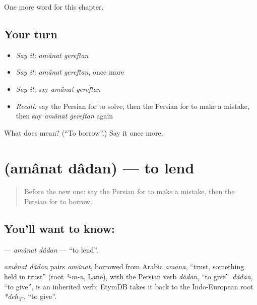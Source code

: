 \begin{grammarlens}[title={What you've built}]
One more word for this chapter.
\end{grammarlens}

\subsection*{Your turn}
\begin{itemize}
\raggedright
  \item \emph{Say it:} \emph{amânat gereftan}
  \item \emph{Say it:} \emph{amânat gereftan}, once more
  \item \emph{Say it:} say \emph{amânat gereftan}
  \item \emph{Recall:} say the Persian for to solve, then the Persian for to make a mistake, then say \emph{amânat gereftan} again
\end{itemize}

\begin{tcolorbox}[breakable,colback=teal!4,colframe=teal!35!black,title={Before you move on}]
What does   mean? (\textquotedblleft{}To borrow\textquotedblright{}.) Say it once more.
\end{tcolorbox}
\section[\texorpdfstring{\fa{امانت} \fa{دادن} (amânat dâdan)}{امانت دادن (amânat dâdan)}]{  (amânat dâdan) — to lend}

\label{lesson:FA-C185-amanat-dadan}



\begin{quote}
Before the new one: say the Persian for to make a mistake, then the Persian for to borrow.
\end{quote}

\subsection*{You'll want to know:  }
\textbf{ } — \emph{amânat dâdan} — \textquotedblleft{}to lend\textquotedblright{}.

\begin{cousinweb}
\emph{amânat dâdan} pairs \emph{amânat}, borrowed from Arabic \emph{amāna}, \textquotedblleft{}trust, something held in trust\textquotedblright{} (root \emph{ʾ-m-n}, Lane), with the Persian verb \emph{dâdan}, \textquotedblleft{}to give\textquotedblright{}. \emph{dâdan}, \textquotedblleft{}to give\textquotedblright{}, is an inherited verb; EtymDB takes it back to the Indo-European root \emph{*deh\textsubscript{3}-}, \textquotedblleft{}to give\textquotedblright{}.
\end{cousinweb}

